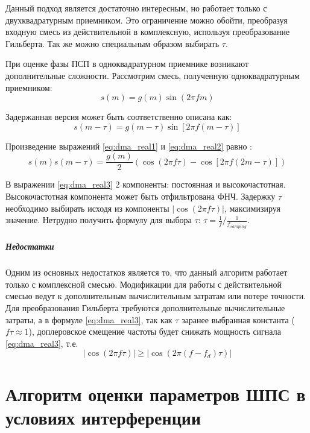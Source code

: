 Данный подход является достаточно интересным, но работает только с двухквадратурным приемником. Это ограничение можно
обойти, преобразуя входную смесь из действительной в комплексную, используя преобразование Гильберта.
Так же можно специальным образом выбирать ${\tau}$.

При оценке фазы ПСП в одноквадратурном приемнике возникают дополнительные сложности. Рассмотрим смесь, полученную одноквадратурным приемником:
\begin{equation}
	\label{eq:dma_real1}
	s(m) = g(m) \sin{(2\pi fm)}
\end{equation}

Задержанная версия может быть соответственно описана как:
\begin{equation}
	\label{eq:dma_real2}
	s(m - \tau) = g(m - \tau) \sin{\left[2\pi f(m-\tau)\right]}
\end{equation}

Произведение выражений \ref{eq:dma_real1} и \ref{eq:dma_real2} равно \cite{tsui}:
\begin{equation}
	\label{eq:dma_real3}
	s(m)s(m - \tau) = \frac{g(m)}{2} \left(\cos (2\pi f \tau) - \cos \left[2 \pi f (2m - \tau)\right]\right)
\end{equation}

В выражении \ref{eq:dma_real3} 2 компоненты: постоянная и высокочастотная. Высокочастотная компонента
может быть отфильтрована ФНЧ. Задержку ${\tau}$ необходимо выбирать исходя из компоненты ${\left| \cos (2\pi f \tau) \right|}$,
максимизируя значение. Нетрудно получить формулу для выбора ${\tau}$: ${\tau = \frac{1}{f} / \frac{1}{f_{samping}}}$.

\subparagraph{Недостатки}
Одним из основных недостатков является то, что данный алгоритм работает только с комплексной смесью. Модификации
для работы с действительной смесью ведут к дополнительным вычислительным затратам или потере точности. Для
преобразования Гильберта требуются дополнительные вычислительные затраты, а в формуле \ref{eq:dma_real3}, так
как ${\tau}$ заранее выбранная константа (${f\tau \approx 1}$), доплеровское смещение частоты будет снижать мощность
сигнала \ref{eq:dma_real3}, т.е.
\begin{equation}
	\left| \cos (2\pi f \tau) \right| \ge \left| \cos (2\pi (f - f_d) \tau) \right|
\end{equation}

\section{Алгоритм оценки параметров ШПС в условиях интерференции}
\label{l:ssec3_dma_lpc_algo}

